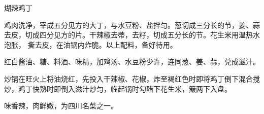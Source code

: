 %
%
%
%
%
%
%
\begin{recipe}[宫保鸡丁]{煳辣鸡丁}

\ingredients


\preparation

\step 鸡肉洗净，宰成五分见方的大丁，与水豆粉、盐拌匀。葱切成三分长的节，姜、蒜
去皮，切成四分见方的片。干辣椒去蒂，去籽，切成五分长的节。花生米用温热水泡胀，
撕去皮，在油锅内炸脆。以上配料，备好待用。

\step 红白酱油、糖、料酒、味精，加鸡汤、水豆粉少许，连同葱、姜、蒜，兑成滋汁。

\step 炒锅在旺火上将油烧红，先投入干辣椒、花椒，炸至褐红色时即将鸡丁倒下混合搅
炒，鸡丁快熟时即倒入滋汁炒匀，临起锅时勾醋下花生米，簸两下入盘。

\features

味香辣，肉鲜嫩，为四川名菜之一。

\end{recipe}

